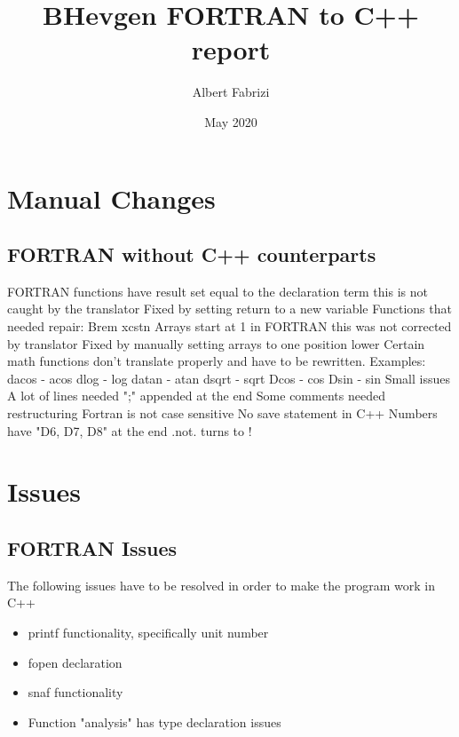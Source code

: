 \documentclass{report}
\title{BHevgen FORTRAN to C++ report}
\author{Albert Fabrizi}
\date{May 2020}
\begin{document}
\maketitle
\chapter{Manual Changes}
\section{FORTRAN without C++ counterparts}
\begin{outline}
    \1 FORTRAN functions have result set equal to the declaration term this is not caught by the translator
        \2Fixed by setting return to a new variable
        \2Functions that needed repair:
            \3Brem
            \3xcstn
    \1 Arrays start at 1 in FORTRAN this was not corrected by translator
        \2Fixed by manually setting arrays to one position lower
    \1 Certain math functions don't translate properly and have to be rewritten. Examples:
        \2dacos - acos
        \2dlog - log
        \2datan - atan
        \2dsqrt - sqrt
        \2Dcos - cos
        \2Dsin - sin
    \1 Small issues
        \2 A lot of lines needed ";" appended at the end
        \2 Some comments needed restructuring
        \2 Fortran is not case sensitive
        \2 No save statement in C++
        \2 Numbers have "D6, D7, D8" at the end
        \2 .not. turns to !
\end{outline}
\chapter{Issues}
\section{FORTRAN Issues}
The following issues have to be resolved in order to make the program work in C++
\begin{itemize}
    \item printf functionality, specifically unit number
    \item fopen declaration
    \item snaf functionality
    \item Function "analysis" has type declaration issues
    
\end{itemize}
\end{document}
